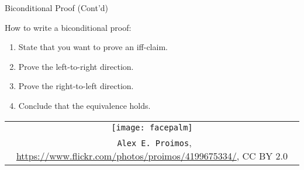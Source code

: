 \documentclass[../slides.tex]{subfiles}
\begin{document}
\begin{frame}{Biconditional Proof (Cont'd)}

How to write a biconditional proof:
			
				\begin{enumerate}[1.]
				
					\item State that you want to prove an iff-claim.
					
					\item Prove the left-to-right direction.
					
					\item Prove the right-to-left direction.
					
					\item Conclude that the equivalence holds.
									
				\end{enumerate}
				
								\begin{center}

\begin{tabular}{c}
		\texttt{[image: facepalm]}\\[-1ex]
		{\tiny \textcopyright~\texttt{Alex E. Proimos}, \url{https://www.flickr.com/photos/proimos/4199675334/}, CC BY 2.0}
		\end{tabular}
		\end{center}

\end{frame}
\end{document}
